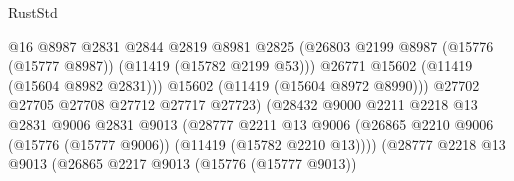 \begin{lexlean}{RustStd}
\begin{coremodule}
                                              @16
                                              @8987
                                              @2831
                                              @2844
                                              @2819
                                              @8981
                                              @2825
                                              (@26803
                                                @2199
                                                @8987
                                                (@15776 (@15777 @8987))
                                                (@11419 (@15782 @2199 @53)))
                                              @26771
                                              @15602
                                              (@11419 (@15604 @8982 @2831)))
                                            @15602
                                            (@11419 (@15604 @8972 @8990)))
                                          @27702
                                          @27705
                                          @27708
                                          @27712
                                          @27717
                                          @27723)
                                        (@28432
                                          @9000
                                          @2211
                                          @2218
                                          @13
                                          @2831
                                          @9006
                                          @2831
                                          @9013
                                          (@28777
                                            @2211
                                            @13
                                            @9006
                                            (@26865
                                              @2210
                                              @9006
                                              (@15776 (@15777 @9006))
                                              (@11419 (@15782 @2210 @13))))
                                          (@28777
                                            @2218
                                            @13
                                            @9013
                                            (@26865
                                              @2217
                                              @9013
                                              (@15776 (@15777 @9013))

\end{coremodule}
\end{lexlean}
